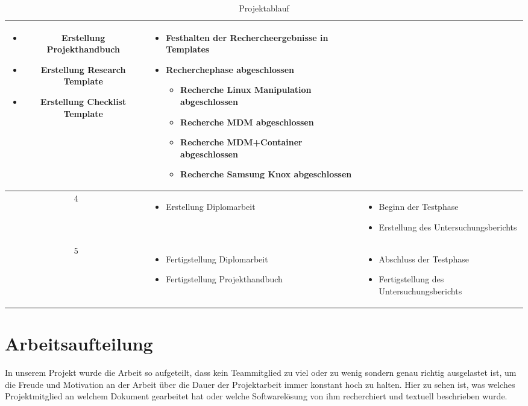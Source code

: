 \begin{table}
\begin{tabular}{| c | p{6cm} | p{7cm} |}
\begin{itemize}
			\item Erstellung Projekthandbuch
			\item Erstellung Research Template
			\item Erstellung Checklist Template
		\end{itemize}
		&%
		\begin{itemize}
			\item Festhalten der Rechercheergebnisse in Templates
			\item Recherchephase abgeschlossen
			\begin{itemize}
				\item Recherche Linux Manipulation abgeschlossen
				\item Recherche MDM abgeschlossen
				\item Recherche MDM+Container abgeschlossen
				\item Recherche Samsung Knox abgeschlossen
			\end{itemize}
		\end{itemize}
		\\\hline %
		4
		&%
		\begin{itemize}
			\item Erstellung Diplomarbeit
		\end{itemize}
		&%
		\begin{itemize}
			\item Beginn der Testphase
			\item Erstellung des Untersuchungsberichts
		\end{itemize}
		\\\hline %
		5
		&%
		\begin{itemize}
			\item Fertigstellung Diplomarbeit
			\item Fertigstellung Projekthandbuch
		\end{itemize}
		&%
		\begin{itemize}
			\item Abschluss der Testphase
			\item Fertigstellung des Untersuchungsberichts
		\end{itemize}
		\\\hline %
	\end{tabular}
	\caption{Projektablauf}
\end{table}

\newpage

\section{Arbeitsaufteilung}
In unserem Projekt wurde die Arbeit so aufgeteilt, dass kein Teammitglied zu viel oder zu wenig sondern genau richtig ausgelastet ist, um die Freude und Motivation an der Arbeit über die Dauer der Projektarbeit immer konstant hoch zu halten. Hier zu sehen ist, was welches Projektmitglied an welchem Dokument gearbeitet hat oder welche Softwarelösung von ihm recherchiert und textuell beschrieben wurde.

